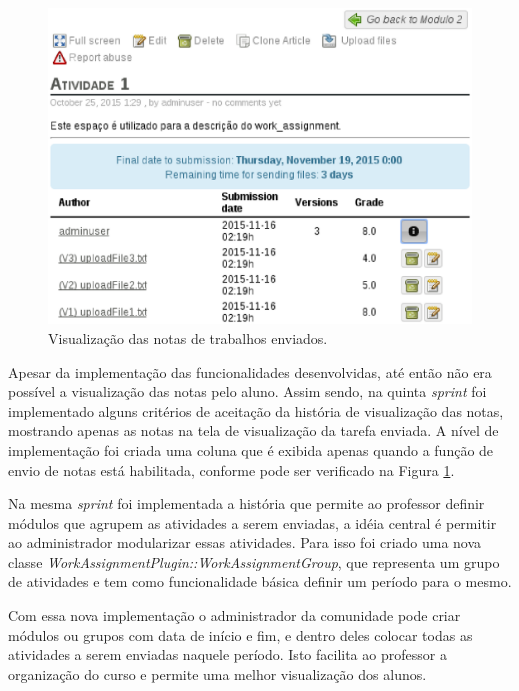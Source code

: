 \begin{figure}[h]
    \centering
    \includegraphics[keepaspectratio=true,scale=0.6]
      {figuras/visualiza-notas.eps}
    \caption{Visualização das notas de trabalhos enviados.}
    \label{fig:visualiza-notas}
\end{figure}

Apesar da implementação das funcionalidades desenvolvidas, até então não era possível a visualização das notas pelo aluno. Assim sendo, na quinta \textit{sprint} foi implementado alguns critérios de aceitação da história de visualização das notas, mostrando apenas as notas na tela de visualização da tarefa enviada. A nível de implementação foi criada uma coluna que é exibida apenas quando a função de envio de notas está habilitada, conforme pode ser verificado na Figura \ref{fig:visualiza-notas}.

Na mesma \textit{sprint} foi implementada a história que permite ao professor definir módulos que agrupem as atividades a serem enviadas, a idéia central é permitir ao administrador modularizar essas atividades. Para isso foi criado uma nova classe \textit{WorkAssignmentPlugin::WorkAssignmentGroup}, que representa um grupo de atividades e tem como funcionalidade básica definir um período para o mesmo.

Com essa nova implementação o administrador da comunidade pode criar módulos ou grupos com data de início e fim, e dentro deles colocar todas as atividades a serem enviadas naquele período. Isto facilita ao professor a organização do curso e permite uma melhor visualização dos alunos.

